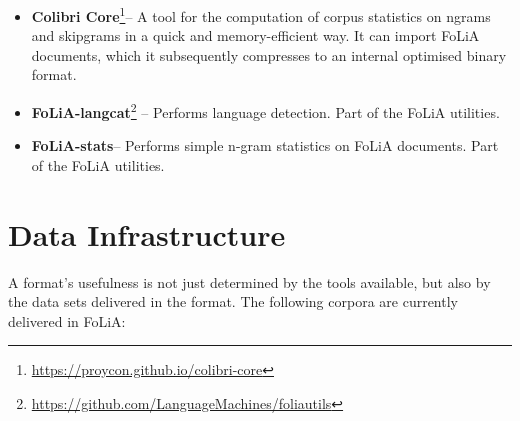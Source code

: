 \documentclass[a4paper,11pt]{article}
\begin{document}
\begin{itemize}
\item \textbf{\textbf{Colibri Core}}\footnote{\url{https://proycon.github.io/colibri-core}}-- A tool for the computation
    of corpus statistics on ngrams and skipgrams in a quick and
    memory-efficient way. It can import FoLiA documents, which it subsequently
    compresses to an internal optimised binary format.
\item \textbf{\textbf{FoLiA-langcat}}\footnote{\url{https://github.com/LanguageMachines/foliautils}} -- Performs language detection. Part of the FoLiA utilities.
\item \textbf{\textbf{FoLiA-stats}}\footnotemark[\value{footnote}] -- Performs simple n-gram statistics on FoLiA documents. Part of the FoLiA utilities.
\end{itemize}





\section{Data Infrastructure}
\label{sec:datainfrastructure}

A format's usefulness is not just determined by the tools
available, but also by the data sets delivered in the format.
The following corpora are currently delivered in FoLiA:
\end{document}
